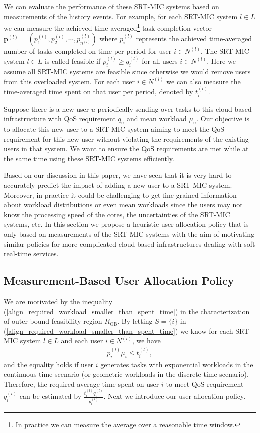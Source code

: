 \documentclass[prodmode,acmtompecs]{acmsmall}
\newcommand{\reqscalar}{q}
\begin{document}
We can evaluate the performance of these SRT-MIC systems based on measurements of the history events. For example, for each SRT-MIC system $l\in L$ we can measure the achieved time-averaged\footnote{In practice we can measure the average over a reasonable time window. } task completion vector $\mathbf{p}^{(l)} = (p_1^{(l)}, p_2^{(l)}, \cdots, p_{n^{(l)}}^{(l)})$ where $p_i^{(l)}$ represents the achieved time-averaged number of tasks completed on time per period for user $i\in N^{(l)}$. The SRT-MIC system $l\in L$ is called feasible if $p_i^{(l)} \geq q_i^{(l)}$ for all users $i\in N^{(l)}$. Here we assume all SRT-MIC systems are feasible since otherwise we would remove users from this overloaded system. 
For each user $i \in N^{(l)}$ we can also measure the time-averaged time spent on that user per period, denoted by $t_i^{(l)}$. 

Suppose there is a new user $u$ periodically sending over tasks to this cloud-based infrastructure with QoS requirement $\reqscalar_u$ and mean workload $\mu_u$. Our objective is to allocate this new user to a SRT-MIC system aiming to meet the QoS requirement for this new user without violating the requirements of the existing users in that system. We want to ensure the QoS requirements are met while at the same time using these SRT-MIC systems efficiently. 

Based on our discussion in this paper, we have seen that it is very hard to accurately predict the impact of adding a new user to a SRT-MIC system. 
Moreover, in practice it could be challenging to get fine-grained information about workload distributions or even mean workloads since the users may not know the processing speed of the cores, the uncertainties of the SRT-MIC systems, etc. 
In this section we propose a heuristic user allocation policy that is only based on measurements of the SRT-MIC systems with the aim of motivating similar policies for more complicated cloud-based infrastructures dealing with soft real-time services. 

\subsection{Measurement-Based User Allocation Policy}
We are motivated by the inequality (\ref{align_required_workload_smaller_than_spent_time}) in the characterization of outer bound feasibility region $R_\text{OB}$. By letting $S=\{i\}$ in (\ref{align_required_workload_smaller_than_spent_time}) we know for each SRT-MIC system $l\in L$ and each user $i \in N^{(l)}$, we have
\begin{align}
\label{align_p_i_mu_i_leq_t_i}
p_i^{(l)} \mu_i \leq t_i^{(l)}, 
\end{align}
and the equality holds if user $i$ generates tasks with exponential workloads in the continuous-time scenario (or geometric workloads in the discrete-time scenario). 
Therefore, the required average time spent on user $i$ to meet QoS requirement $\reqscalar_i^{(l)}$ can be estimated by $\frac{t_i^{(l)} \reqscalar_i^{(l)}}{p_i^{(l)}}$. Next we introduce our user allocation policy. 
\end{document}
